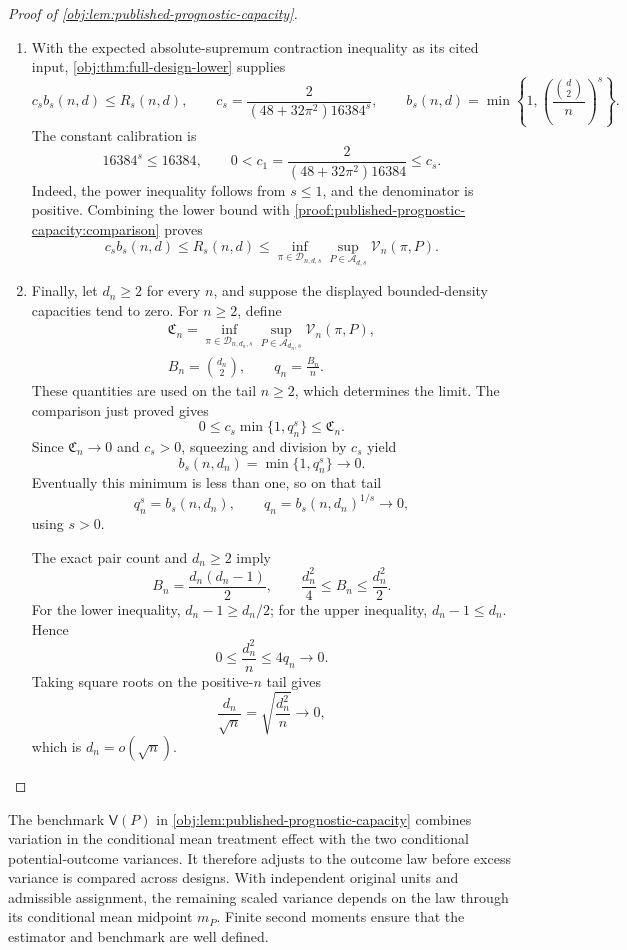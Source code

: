 \documentclass[11pt]{article}
\begin{document}
\begin{proof}[Proof of \cref{obj:lem:published-prognostic-capacity}]
\begin{enumerate}
\item With the expected absolute-supremum contraction inequality
\citep[Theorem 12(4), with Definition 2]{BartlettMendelson2002Complexities}
as its cited input, \cref{obj:thm:full-design-lower} supplies
\[
c_s b_s(n,d)\leq R_s(n,d),
\qquad
c_s=\frac{2}{(48+32\pi^2)16384^s},
\qquad
b_s(n,d)=\min\left\{1,\left(\frac{\binom d2}{n}\right)^s\right\}.
\]
The constant calibration is
\[
16384^s\leq16384,
\qquad
0<c_1=\frac{2}{(48+32\pi^2)16384}\leq c_s.
\]
Indeed, the power inequality follows from \(s\leq1\), and the denominator is positive. Combining the lower bound with \cref{proof:published-prognostic-capacity:comparison} proves
\[
c_s b_s(n,d)
\leq R_s(n,d)
\leq
\inf_{\pi\in\mathcal D_{n,d,s}}
\sup_{P\in\mathcal A_{d,s}}\mathcal V_n(\pi,P).
\]

\item Finally, let \(d_n\geq2\) for every \(n\), and suppose the displayed bounded-density capacities tend to zero. For \(n\geq2\), define
\[
\begin{gathered}
\mathfrak C_n
=
\inf_{\pi\in\mathcal D_{n,d_n,s}}
\sup_{P\in\mathcal A_{d_n,s}}\mathcal V_n(\pi,P),\\
B_n=\binom{d_n}{2},
\qquad
q_n=\frac{B_n}{n}.
\end{gathered}
\]
These quantities are used on the tail \(n\geq2\), which determines the limit. The comparison just proved gives
\[
0\leq c_s\min\{1,q_n^s\}\leq\mathfrak C_n.
\]
Since \(\mathfrak C_n\to0\) and \(c_s>0\), squeezing and division by \(c_s\) yield
\[
b_s(n,d_n)=\min\{1,q_n^s\}\longrightarrow0.
\]
Eventually this minimum is less than one, so on that tail
\[
q_n^s=b_s(n,d_n),
\qquad
q_n=b_s(n,d_n)^{1/s}\longrightarrow0,
\]
using \(s>0\).

The exact pair count and \(d_n\geq2\) imply
\[
B_n=\frac{d_n(d_n-1)}2,
\qquad
\frac{d_n^2}{4}\leq B_n\leq\frac{d_n^2}{2}.
\]
For the lower inequality, \(d_n-1\geq d_n/2\); for the upper inequality, \(d_n-1\leq d_n\). Hence
\[
0\leq\frac{d_n^2}{n}\leq4q_n\longrightarrow0.
\]
Taking square roots on the positive-\(n\) tail gives
\[
\frac{d_n}{\sqrt n}
=\sqrt{\frac{d_n^2}{n}}\longrightarrow0,
\]
which is \(d_n=o(\sqrt n)\).
\end{enumerate}
\end{proof}

The benchmark \(\mathsf V(P)\) in \cref{obj:lem:published-prognostic-capacity} combines variation in the conditional mean treatment effect with the two conditional potential-outcome variances. It therefore adjusts to the outcome law before excess variance is compared across designs. With independent original units and admissible assignment, the remaining scaled variance depends on the law through its conditional mean midpoint \(m_P\). Finite second moments ensure that the estimator and benchmark are well defined.
\end{document}
